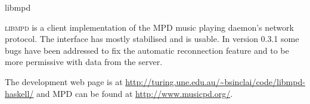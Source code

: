 \begin{hcarentry}{libmpd}
\makeheader

\textsc{libmpd} is a client implementation of the MPD music playing daemon's
network protocol. The interface has mostly stabilised and is usable.  In
version 0.3.1 some bugs have been addressed to fix the automatic reconnection
feature and to be more permissive with data from the server.

\FurtherReading
The development web page is at
\url{http://turing.une.edu.au/~bsinclai/code/libmpd-haskell/} and MPD
can be found at \url{http://www.musicpd.org/}.
\end{hcarentry}
